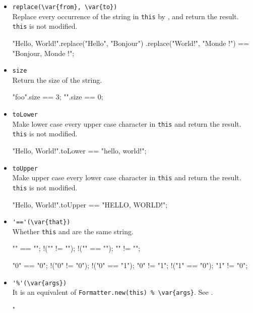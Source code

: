 \begin{itemize}
\item \lstinline|replace(\var{from}, \var{to})|\\
  Replace every occurrence of the string  in
  \lstinline|this| by , and return the result.
  \lstinline|this| is not modified.
\begin{urbiassert}
"Hello, World!".replace("Hello", "Bonjour")
                      .replace("World!", "Monde !") ==
       "Bonjour, Monde !";
\end{urbiassert}

\item \lstinline|size|\\
  Return the size of the string.
\begin{urbiassert}
"foo".size == 3;
"".size == 0;
\end{urbiassert}

\item \lstinline|toLower|\\
  Make lower case every upper case character in \lstinline|this| and
  return the result.  \lstinline|this| is not modified.
\begin{urbiassert}
"Hello, World!".toLower == "hello, world!";
\end{urbiassert}

\item \lstinline|toUpper|\\
  Make upper case every lower case character in \lstinline|this| and
  return the result.  \lstinline|this| is not modified.
\begin{urbiassert}
"Hello, World!".toUpper == "HELLO, WORLD!";
\end{urbiassert}

\item \lstinline|'=='(\var{that})|\\
  Whether \lstinline|this| and  are the same string.
\begin{urbiassert}
  "" == "";        !("" != "");
!("" == "\0");       "" != "\0";

  "0" == "0";      !("0" != "0");
!("0" == "1");       "0" != "1";
!("1" == "0");       "1" != "0";
\end{urbiassert}

\item \lstinline|'%'(\var{args})|\\
  It is an equivalent of \lstinline|Formatter.new(this) % \var{args}|.
  See .
\begin{urbiassert}
"%
\end{urbiassert}


\end{itemize}
